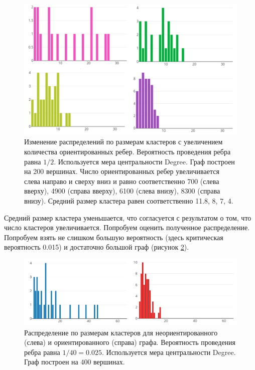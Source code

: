 \begin{figure}[h!]
	\centering
	\includegraphics[width=\textwidth]{pics/d1234.png}
	\caption{Изменение распределений по размерам кластеров с увеличением количества ориентированных ребер. Вероятность проведения ребра равна $1/2$. Используется мера центральности Degree. Граф построен на 200 вершинах. Число ориентированных ребер увеличивается слева направо и сверху вниз и равно соответственно 700 (слева вверху), 4900 (справа вверху), 6100 (слева внизу), 8300 (справа внизу). Средний размер кластера равен соответственно 11.8, 8, 7, 4.} 
	\label{fig:d1234}
\end{figure}

Средний размер кластера уменьшается, что согласуется с результатом о том, что число кластеров увеличивается. Попробуем оценить полученное распределение.  Попробуем взять не слишком большую вероятность (здесь критическая вероятность 0.015) и достаточно большой граф (рисунок \ref{fig:d12}).

\begin{figure}[h!]
	\centering
	\includegraphics[width=\textwidth]{pics/d12.png}
	\caption{Распределение по размерам кластеров для неориентированного (слева) и ориентированного (справа) графа. Вероятность проведения ребра равна $1/40=0.025$. Используется мера центральности Degree. Граф построен на 400 вершинах.} 
	\label{fig:d12}
\end{figure}

